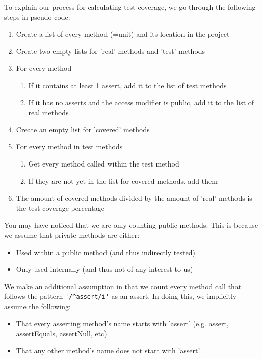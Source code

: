 \documentclass{article}
\begin{document}
To explain our process for calculating test coverage, we go through the following steps in pseudo code:

\begin{enumerate}
\item Create a list of every method (=unit) and its location in the project
\item Create two empty lists for 'real' methods and 'test' methods
\item For every method
	\begin{enumerate}
	\item If it contains at least 1 assert, add it to the list of test methods
	\item If it has no asserts and the access modifier is public, add it to the list of real methods
	\end{enumerate}
\item Create an empty list for 'covered' methods
\item For every method in test methods
	\begin{enumerate}
	\item Get every method called within the test method
	\item If they are not yet in the list for covered methods, add them
	\end{enumerate}
\item The amount of covered methods divided by the amount of 'real' methods is the test coverage percentage
\end{enumerate}

You may have noticed that we are only counting public methods. This is because we assume that private methods are either:

\begin{itemize}
\item Used within a public method (and thus indirectly tested)
\item Only used internally (and thus not of any interest to us)
\end{itemize}

We make an additional assumption in that we count every method call that follows the pattern \verb|'/^assert/i'| as an assert. In doing this, we implicitly assume the following:
\begin{itemize}
\item That every asserting method's name starts with 'assert' (e.g. assert, assertEquals, assertNull, etc)
\item That any other method's name does not start with 'assert'.
\end{itemize}
\end{document}
